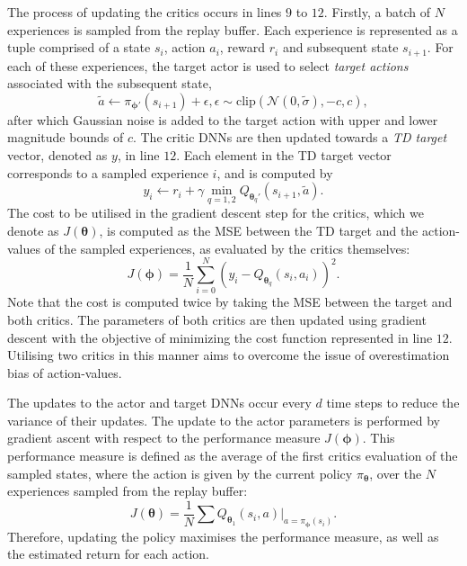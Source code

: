 The process of updating the critics occurs in lines $9$ to $12$. 
Firstly, a batch of $N$ experiences is sampled from the replay buffer.
Each experience is represented as a tuple comprised of a state $s_i$, action $a_i$, reward $r_i$ and subsequent state $s_{i+1}$.
For each of these experiences, the target actor is used to select \emph{target actions} associated with the subsequent state,
\begin{equation}
    \tilde{a} \leftarrow \pi_{\bm{\phi}'}(s_{i+1}) + \epsilon, \epsilon \sim \text{clip}(\mathcal{N}(0,\tilde{\sigma}), -c,c),
\end{equation}
after which Gaussian noise is added to the target action with upper and lower magnitude bounds of $c$.
The critic DNNs are then updated towards a \emph{TD target} vector, denoted as $y$, in line $12$.
Each element in the TD target vector corresponds to a sampled experience $i$, and is computed by
\begin{equation}
    y_i \leftarrow r_i + \gamma \min_{q=1,2} Q_{\bm{\theta}_q'}(s_{i+1}, \tilde{a}).
\end{equation}
The cost to be utilised in the gradient descent step for the critics, which we denote as $J(\bm{\theta})$, is computed as the MSE between the TD target and the action-values of the sampled experiences, as evaluated by the critics themselves:
\begin{equation}
     J(\bm{\phi}) = \frac{1}{N} \sum_{i=0}^{N} (y_i - Q_{\bm{\theta}_q}(s_i,a_i))^{2}.
\end{equation}
Note that the cost is computed twice by taking the MSE between the target and both critics.
The parameters of both critics are then updated using gradient descent with the objective of minimizing the cost function represented in line $12$.
Utilising two critics in this manner aims to overcome the issue of overestimation bias of action-values.


The updates to the actor and target DNNs occur every $d$ time steps to reduce the variance of their updates. 
The update to the actor parameters is performed by gradient ascent with respect to the performance measure $J(\bm{\phi})$.
This performance measure is defined as the average of the first critics evaluation of the sampled states, where the action is given by the current policy $\pi_{\bm{\theta}}$, over the $N$ experiences sampled from the replay buffer:
\begin{equation}
    J(\bm{\theta}) = \frac{1}{N} \sum Q_{\bm{\theta}_1}(s_i,a) | _{a=\pi_{\bm{\phi}}(s_i)}.
\end{equation}
Therefore, updating the policy maximises the performance measure, as well as the estimated return for each action.



